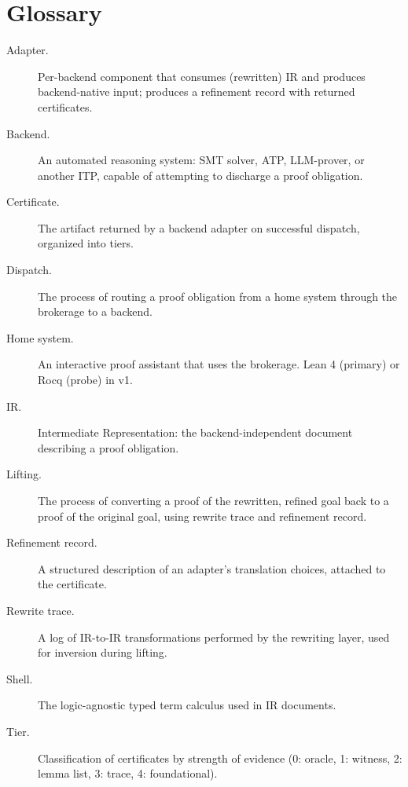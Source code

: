\documentclass[11pt,letterpaper]{article}
\theoremstyle{definition}
\theoremstyle{remark}
\begin{document}
\section{Glossary}
\label{app:glossary}

\begin{description}
  \item[Adapter.] Per-backend component that consumes (rewritten) IR
        and produces backend-native input; produces a refinement
        record with returned certificates.
  \item[Backend.] An automated reasoning system: SMT solver, ATP,
        LLM-prover, or another ITP, capable of attempting to discharge
        a proof obligation.
  \item[Certificate.] The artifact returned by a backend adapter on
        successful dispatch, organized into tiers.
  \item[Dispatch.] The process of routing a proof obligation from a
        home system through the brokerage to a backend.
  \item[Home system.] An interactive proof assistant that uses the
        brokerage. Lean 4 (primary) or Rocq (probe) in v1.
  \item[IR.] Intermediate Representation: the backend-independent
        document describing a proof obligation.
  \item[Lifting.] The process of converting a proof of the rewritten,
        refined goal back to a proof of the original goal, using
        rewrite trace and refinement record.
  \item[Refinement record.] A structured description of an adapter's
        translation choices, attached to the certificate.
  \item[Rewrite trace.] A log of IR-to-IR transformations performed by
        the rewriting layer, used for inversion during lifting.
  \item[Shell.] The logic-agnostic typed term calculus used in IR
        documents.
  \item[Tier.] Classification of certificates by strength of evidence
        (0: oracle, 1: witness, 2: lemma list, 3: trace, 4:
        foundational).
\end{description}
\end{document}
